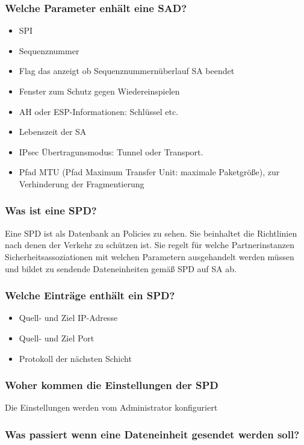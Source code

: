 	\subsubsection{Welche Parameter enhält eine SAD?}
	\begin{itemize}
		\item SPI
		\item Sequenznummer
		\item Flag das anzeigt ob Sequenznummernüberlauf SA beendet
		\item Fenster zum Schutz gegen Wiedereinspielen
		\item AH oder ESP-Informationen: Schlüssel etc.
		\item Lebenszeit der SA
		\item IPsec Übertragunsmodus: Tunnel oder Transport.
		\item Pfad MTU (Pfad Maximum Transfer Unit: maximale Paketgröße), zur Verhinderung der Fragmentierung
	\end{itemize}
	
	\subsubsection{Was ist eine SPD?}
	Eine SPD ist als Datenbank an Policies zu sehen. Sie beinhaltet die Richtlinien nach denen der Verkehr zu schützen ist.  Sie regelt für welche Partnerinstanzen Sicherheitsassoziationen mit welchen Parametern ausgehandelt werden müssen und bildet zu sendende Dateneinheiten gemäß SPD auf SA ab.
	
	\subsubsection{Welche Einträge enthält ein SPD?}
	\begin{itemize}
		\item Quell- und Ziel IP-Adresse
		\item Quell- und Ziel Port
		\item Protokoll der nächsten Schicht
	\end{itemize}	
	
	\subsubsection{Woher kommen die Einstellungen der SPD}
	Die Einstellungen werden vom Administrator konfiguriert		
	
	\subsubsection{Was passiert wenn eine Dateneinheit gesendet werden soll?}
		
